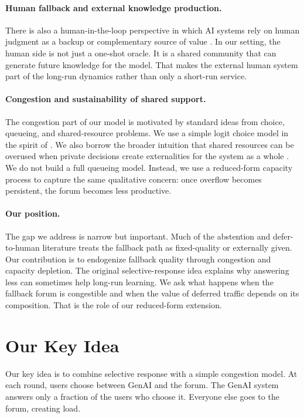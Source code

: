 \documentclass{article}
\begin{document}
\paragraph{Human fallback and external knowledge production.}
There is also a human-in-the-loop perspective in which AI systems rely on human judgment as a backup or complementary source of value \citep{horvitz1999principles,amershi2014power,kleinberg2018human,madras2018predict,bansal2021does}. In our setting, the human side is not just a one-shot oracle. It is a shared community that can generate future knowledge for the model. That makes the external human system part of the long-run dynamics rather than only a short-run service.

\paragraph{Congestion and sustainability of shared support.}
The congestion part of our model is motivated by standard ideas from choice, queueing, and shared-resource problems. We use a simple logit choice model in the spirit of \citet{mcfadden1974conditional}. We also borrow the broader intuition that shared resources can be overused when private decisions create externalities for the system as a whole \citep{hardin1968tragedy,ostrom1990governing,vickrey1969congestion,roughgarden2005selfish,kleinrock1975queueing}. We do not build a full queueing model. Instead, we use a reduced-form capacity process to capture the same qualitative concern: once overflow becomes persistent, the forum becomes less productive.

\paragraph{Our position.}
The gap we address is narrow but important. Much of the abstention and defer-to-human literature treats the fallback path as fixed-quality or externally given. Our contribution is to endogenize fallback quality through congestion and capacity depletion. The original selective-response idea explains why answering less can sometimes help long-run learning. We ask what happens when the fallback forum is congestible and when the value of deferred traffic depends on its composition. That is the role of our reduced-form extension.

\section{Our Key Idea}
Our key idea is to combine selective response with a simple congestion model. At each round, users choose between GenAI and the forum. The GenAI system answers only a fraction of the users who choose it. Everyone else goes to the forum, creating load.
\end{document}
